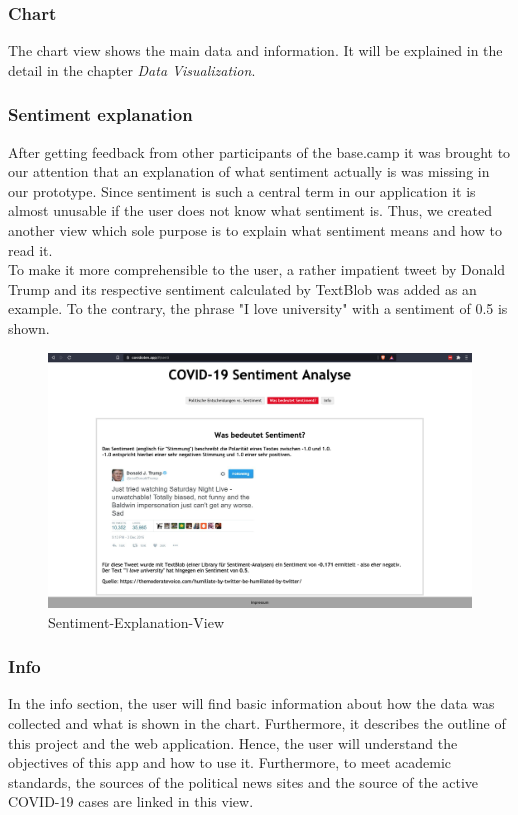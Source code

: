 \documentclass[
    fontsize=12pt,
    headings=small,
    parskip=half,           %
    bibliography=totoc,
    numbers=noenddot,       %
    open=any,               %
    ]{scrreprt}
\begin{document}
\subsubsection*{Chart}
The chart view shows the main data and information. It will be explained in the detail in the chapter \textit{Data Visualization}.


\subsubsection*{Sentiment explanation}
After getting feedback from other participants of the base.camp it was brought to our attention that an explanation of what sentiment actually is was missing in our prototype. Since sentiment is such a central term in our application it is almost unusable if the user does not know what sentiment is. Thus, we created another view which sole purpose is to explain what sentiment means and how to read it. \\
To make it more comprehensible to the user, a rather impatient tweet by Donald Trump and its respective sentiment calculated by TextBlob was added as an example. To the contrary, the phrase "I love university" with a sentiment of 0.5 is shown. 

\begin{figure}
    \centering
    \includegraphics[width=1.0\textwidth]{pic/Senti-Explanation.png}
    \caption{Sentiment-Explanation-View}
    \label{fig:my_label}
\end{figure}

\subsubsection*{Info}
In the info section, the user will find basic information about how the data was collected and what is shown in the chart. Furthermore, it describes the outline of this project and the web application. Hence, the user will understand the objectives of this app and how to use it. Furthermore, to meet academic standards, the sources of the political news sites and the source of the active COVID-19 cases are linked in this view.
\end{document}
